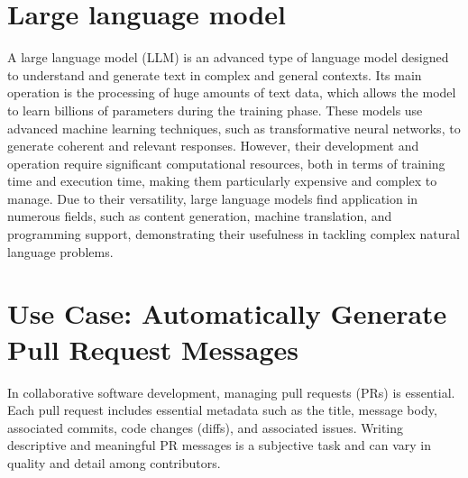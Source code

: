 \section{Large language model}
A large language model (LLM) is an advanced type of language model designed to understand and generate text in complex and general contexts.
Its main operation is the processing of huge amounts of text data, which allows the model to learn billions of parameters during the training phase.
These models use advanced machine learning techniques, such as transformative neural networks, to generate coherent and relevant responses. 
However, their development and operation require significant computational resources, 
both in terms of training time and execution time, making them particularly expensive and complex to manage.
Due to their versatility, large language models find application in numerous fields, such as content generation, machine translation, and programming support, demonstrating their usefulness in tackling complex natural language problems.

\section{Use Case: Automatically Generate Pull Request Messages}
In collaborative software development, managing pull requests (PRs) is essential. Each pull request includes essential metadata such as the title, message body, associated commits, code changes (diffs), and associated issues. Writing descriptive and meaningful PR messages is a subjective task and can vary in quality and detail among contributors.
